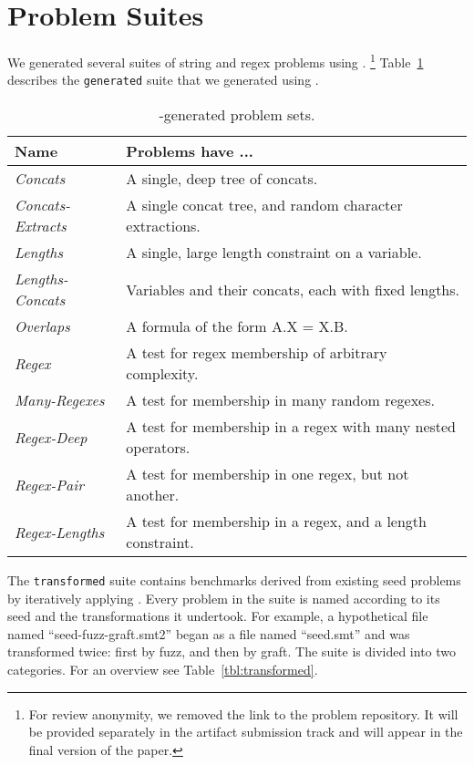 \section{Problem Suites}
\label{sec:problems}

    We generated several suites of string and regex problems using \fuzzer{}. \footnote{For review anonymity, we removed the link to the problem repository. It will be provided separately in the artifact submission track and will appear in the final version of the paper.} Table~\ref{tbl:generated} describes the \texttt{generated} suite that we generated using \generator{}.

    \begin{table}
        \centering
        \begin{tabular}{|l|l|}
            \hline
            \textbf{Name}             & \textbf{Problems have ...} \\ \hline
            \textit{Concats}          & A single, deep tree of concats. \\ \hline
            \textit{Concats-Extracts} & A single concat tree, and random character extractions. \\ \hline
            \textit{Lengths}          & A single, large length constraint on a variable. \\ \hline
            \textit{Lengths-Concats}  & Variables and their concats, each with fixed lengths. \\ \hline
            \textit{Overlaps}         & A formula of the form A.X = X.B. \\ \hline
            \textit{Regex}            & A test for regex membership of arbitrary complexity. \\ \hline
            \textit{Many-Regexes}     & A test for membership in many random regexes. \\ \hline
            \textit{Regex-Deep}       & A test for membership in a regex with many nested operators. \\ \hline
            \textit{Regex-Pair}       & A test for membership in one regex, but not another. \\ \hline
            \textit{Regex-Lengths}    & A test for membership in a regex, and a length constraint. \\ \hline
        \end{tabular}
        \caption{\generator{}-generated problem sets.}
        \label{tbl:generated}
    \end{table}

    The \texttt{transformed} suite contains benchmarks derived from existing seed problems by iteratively applying \transformer{}. Every problem in the suite is named according to its seed and the transformations it undertook. For example, a hypothetical file named ``seed-fuzz-graft.smt2'' began as a file named ``seed.smt'' and was transformed twice: first by fuzz, and then by graft. The suite is divided into two categories. For an overview see Table~\ref{tbl:transformed}.

